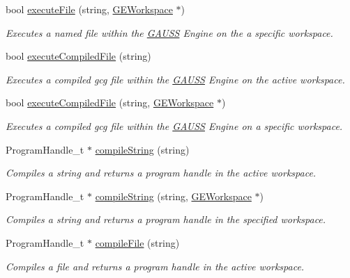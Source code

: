\begin{DoxyCompactItemize}
bool \hyperlink{class_g_a_u_s_s_aadc273c128c4d1fadb6edf0df7112107}{execute\-File} (string, \hyperlink{class_g_e_workspace}{G\-E\-Workspace} $\ast$)
\begin{DoxyCompactList}\small\item\em Executes a named file within the \hyperlink{class_g_a_u_s_s}{G\-A\-U\-S\-S} Engine on the a specific workspace. \end{DoxyCompactList}\item 
bool \hyperlink{class_g_a_u_s_s_a1b971703024494d1390241b86099ddbb}{execute\-Compiled\-File} (string)
\begin{DoxyCompactList}\small\item\em Executes a compiled gcg file within the \hyperlink{class_g_a_u_s_s}{G\-A\-U\-S\-S} Engine on the active workspace. \end{DoxyCompactList}\item 
bool \hyperlink{class_g_a_u_s_s_ad553ead84eec837e60782f16a3e242f8}{execute\-Compiled\-File} (string, \hyperlink{class_g_e_workspace}{G\-E\-Workspace} $\ast$)
\begin{DoxyCompactList}\small\item\em Executes a compiled gcg file within the \hyperlink{class_g_a_u_s_s}{G\-A\-U\-S\-S} Engine on a specific workspace. \end{DoxyCompactList}\item 
Program\-Handle\-\_\-t $\ast$ \hyperlink{class_g_a_u_s_s_a5062f8fabacaba21e242785a6461f9d1}{compile\-String} (string)
\begin{DoxyCompactList}\small\item\em Compiles a string and returns a program handle in the active workspace. \end{DoxyCompactList}\item 
Program\-Handle\-\_\-t $\ast$ \hyperlink{class_g_a_u_s_s_a13db047afc85a0ef2406b5e054bdea83}{compile\-String} (string, \hyperlink{class_g_e_workspace}{G\-E\-Workspace} $\ast$)
\begin{DoxyCompactList}\small\item\em Compiles a string and returns a program handle in the specified workspace. \end{DoxyCompactList}\item 
Program\-Handle\-\_\-t $\ast$ \hyperlink{class_g_a_u_s_s_a182412bc30b9750b57de41d2334470de}{compile\-File} (string)
\begin{DoxyCompactList}\small\item\em Compiles a file and returns a program handle in the active workspace. \end{DoxyCompactList}\item 

\end{DoxyCompactItemize}

